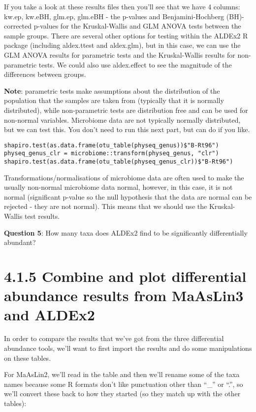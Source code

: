 \documentclass[
]{book}
\begin{document}
If you take a look at these results files then you'll see that we have 4 columns: kw.ep, kw.eBH, glm.ep, glm.eBH - the p-values and Benjamini-Hochberg (BH)-corrected p-values for the Kruskal-Wallis and GLM ANOVA tests between the sample groups. There are several other options for testing within the ALDEx2 R package (including aldex.ttest and aldex.glm), but in this case, we can use the GLM ANOVA results for parametric tests and the Kruskal-Wallis results for non-parametric tests. We could also use aldex.effect to see the magnitude of the differences between groups.

\textbf{Note}: parametric tests make assumptions about the distribution of the population that the samples are taken from (typically that it is normally distributed), while non-parametric tests are distribution free and can be used for non-normal variables. Microbiome data are not typically normally distributed, but we can test this. You don't need to run this next part, but can do if you like.

\begin{verbatim}
shapiro.test(as.data.frame(otu_table(physeq_genus))$"B-Rt96")
physeq_genus_clr = microbiome::transform(physeq_genus, "clr")
shapiro.test(as.data.frame(otu_table(physeq_genus_clr))$"B-Rt96")
\end{verbatim}

Transformations/normalisations of microbiome data are often used to make the usually non-normal microbiome data normal, however, in this case, it is not normal (significant p-value so the null hypothesis that the data are normal can be rejected - they are not normal). This means that we should use the Kruskal-Wallis test results.

\textbf{Question 5}: How many taxa does ALDEx2 find to be significantly differentially abundant?

\section{4.1.5 Combine and plot differential abundance results from MaAsLin3 and ALDEx2}\label{combine-and-plot-differential-abundance-results-from-maaslin3-and-aldex2}

In order to compare the results that we've got from the three differential abundance tools, we'll want to first import the results and do some manipulations on these tables.

For MaAsLin2, we'll read in the table and then we'll rename some of the taxa names because some R formats don't like punctuation other than ``\_'' or ``.'', so we'll convert these back to how they started (so they match up with the other tables):
\end{document}
